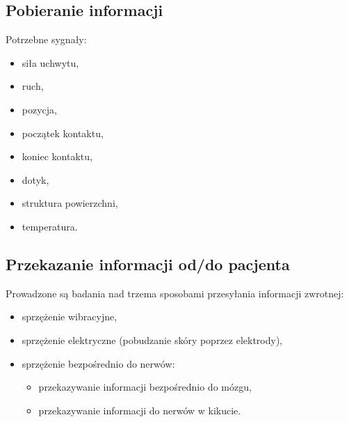 \documentclass[8pt]{beamer}
\begin{document}
	\subsection{Pobieranie informacji}
		\begin{frame}
		Potrzebne sygnały:
			\begin{itemize}[<+->]
				\item siła uchwytu,
				\item ruch,
				\item pozycja,
				\item początek kontaktu,
				\item koniec kontaktu,
				\item dotyk, 
				\item struktura powierzchni,
				\item temperatura.
			\end{itemize}
		\end{frame}		
		
		
		
		\subsection{Przekazanie informacji od/do pacjenta}	
	
		
		\begin{frame}
			Prowadzone są badania nad trzema sposobami przesyłania informacji zwrotnej:
			\begin{itemize}[<+->]
				\item sprzężenie wibracyjne,
				\item sprzężenie elektryczne (pobudzanie skóry poprzez elektrody),
				\item sprzężenie bezpośrednio do nerwów:
				\begin{itemize}[<+->]
					\item przekazywanie informacji bezpośrednio do mózgu,
					\item przekazywanie informacji do nerwów w kikucie.
				\end{itemize}
			\end{itemize}
		\end{frame}
		
\end{document}
